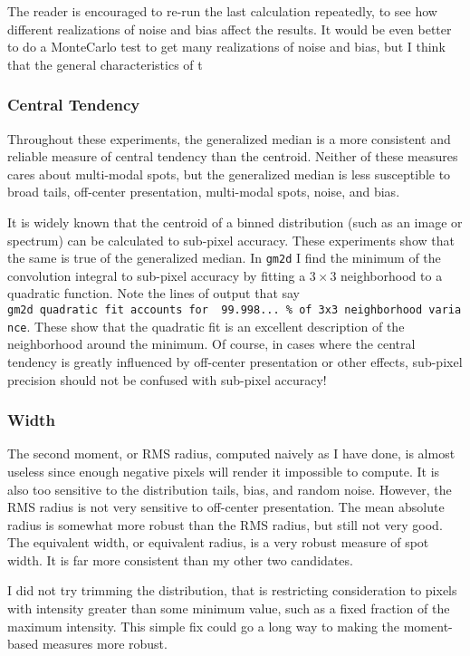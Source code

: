 \documentclass[11pt]{article}
\begin{document}
The reader is encouraged to re-run the last calculation repeatedly, to
see how different realizations of noise and bias affect the results. It
would be even better to do a MonteCarlo test to get many realizations of
noise and bias, but I think that the general characteristics of t

\subsubsection{Central Tendency}\label{central-tendency}

Throughout these experiments, the generalized median is a more
consistent and reliable measure of central tendency than the centroid.
Neither of these measures cares about multi-modal spots, but the
generalized median is less susceptible to broad tails, off-center
presentation, multi-modal spots, noise, and bias.

It is widely known that the centroid of a binned distribution (such as
an image or spectrum) can be calculated to sub-pixel accuracy. These
experiments show that the same is true of the generalized median. In
\texttt{gm2d} I find the minimum of the convolution integral to
sub-pixel accuracy by fitting a \(3\times 3\) neighborhood to a
quadratic function. Note the lines of output that say
\texttt{gm2d\ quadratic\ fit\ accounts\ for\ \ 99.998...\ \%\ of\ 3x3\ neighborhood\ variance}.
These show that the quadratic fit is an excellent description of the
neighborhood around the minimum. Of course, in cases where the central
tendency is greatly influenced by off-center presentation or other
effects, sub-pixel precision should not be confused with sub-pixel
accuracy!

\subsubsection{Width}\label{width}

The second moment, or RMS radius, computed naively as I have done, is
almost useless since enough negative pixels will render it impossible to
compute. It is also too sensitive to the distribution tails, bias, and
random noise. However, the RMS radius is not very sensitive to
off-center presentation. The mean absolute radius is somewhat more
robust than the RMS radius, but still not very good. The equivalent
width, or equivalent radius, is a very robust measure of spot width. It
is far more consistent than my other two candidates.

I did not try trimming the distribution, that is restricting
consideration to pixels with intensity greater than some minimum value,
such as a fixed fraction of the maximum intensity. This simple fix could
go a long way to making the moment-based measures more robust.
\end{document}
